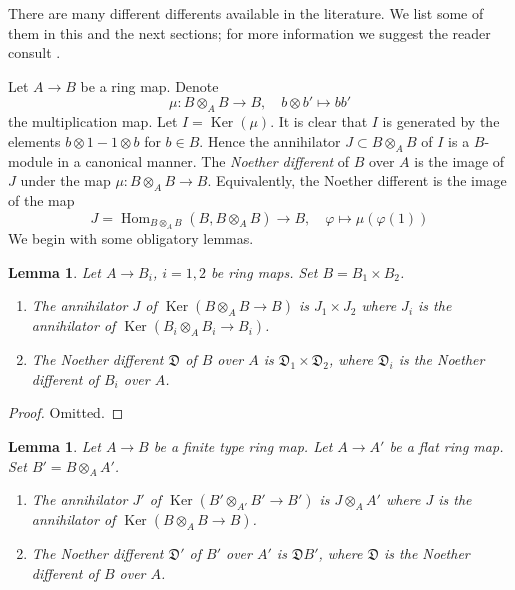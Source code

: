 \documentclass{stacks-project}
\theoremstyle{plain}
\newtheorem{lemma}[subsection]{Lemma}
\theoremstyle{definition}
\theoremstyle{remark}
\numberwithin{equation}{subsection}
\def\Hom{\mathop{\mathrm{Hom}}\nolimits}
\def\Ker{\mathop{\mathrm{Ker}}}
\begin{document}
\noindent
There are many different differents available in the literature.
We list some of them in this and the next sections; for more
information we suggest the reader consult \cite{Kunz}.

\medskip\noindent
Let $A \to B$ be a ring map. Denote
$$
\mu : B \otimes_A B \longrightarrow B,\quad
b \otimes b' \longmapsto bb'
$$
the multiplication map. Let $I = \Ker(\mu)$. It is clear that $I$ is
generated by the elements $b \otimes 1 - 1 \otimes b$ for $b \in B$.
Hence the annihilator $J \subset B \otimes_A B$ of $I$ is a $B$-module
in a canonical manner. The {\it Noether different} of $B$ over $A$ is
the image of $J$ under the map $\mu : B \otimes_A B \to B$. Equivalently,
the Noether different is the image of the map
$$
J = \Hom_{B \otimes_A B}(B, B \otimes_A B) \longrightarrow B,\quad
\varphi \longmapsto \mu(\varphi(1))
$$
We begin with some obligatory lemmas.

\begin{lemma}
\label{lemma-noether-different-product}
Let $A \to B_i$, $i = 1, 2$ be ring maps. Set $B = B_1 \times B_2$.
\begin{enumerate}
\item The annihilator $J$ of $\Ker(B \otimes_A B \to B)$ is $J_1 \times J_2$
where $J_i$ is the annihilator of $\Ker(B_i \otimes_A B_i \to B_i)$.
\item The Noether different $\mathfrak{D}$ of $B$ over $A$ is
$\mathfrak{D}_1 \times \mathfrak{D}_2$, where $\mathfrak{D}_i$ is
the Noether different of $B_i$ over $A$.
\end{enumerate}
\end{lemma}

\begin{proof}
Omitted.
\end{proof}

\begin{lemma}
\label{lemma-noether-different-base-change}
Let $A \to B$ be a finite type ring map. Let $A \to A'$ be a flat ring map.
Set $B' = B \otimes_A A'$.
\begin{enumerate}
\item The annihilator $J'$ of $\Ker(B' \otimes_{A'} B' \to B')$ is
$J \otimes_A A'$ where $J$ is the annihilator of $\Ker(B \otimes_A B \to B)$.
\item The Noether different $\mathfrak{D}'$ of $B'$ over $A'$ is
$\mathfrak{D}B'$, where $\mathfrak{D}$ is
the Noether different of $B$ over $A$.
\end{enumerate}
\end{lemma}
\end{document}
